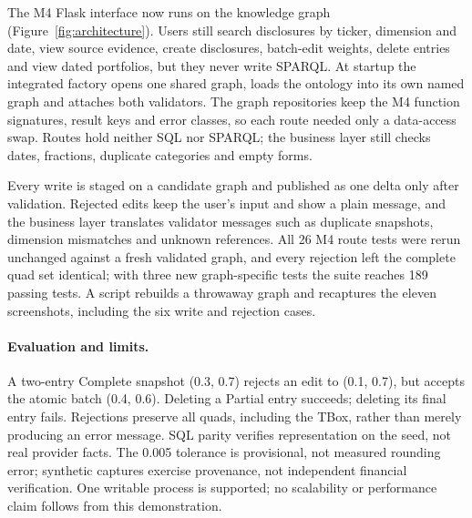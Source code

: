 The M4 Flask interface now runs on the knowledge graph
(Figure~\ref{fig:architecture}). Users still search disclosures by ticker,
dimension and date, view source evidence, create disclosures, batch-edit
weights, delete entries and view dated portfolios, but they never write SPARQL.
At startup the integrated factory opens one shared graph, loads the ontology into
its own named graph and attaches both validators. The graph repositories keep the
M4 function signatures, result keys and error classes, so each route needed only
a data-access swap. Routes hold neither SQL nor SPARQL; the business layer still checks
dates, fractions, duplicate categories and empty forms.

Every write is staged on a candidate graph and published as one delta only after
validation. Rejected edits keep the user's input and show a plain message, and the business
layer translates validator messages such as duplicate snapshots, dimension
mismatches and unknown references. All 26 M4 route tests were rerun
unchanged against a fresh validated graph, and every rejection left the complete
quad set identical; with three new graph-specific tests the suite reaches 189
passing tests. A script rebuilds a throwaway graph and recaptures the eleven screenshots,
including the six write and rejection cases.

\paragraph{Evaluation and limits.}
A two-entry Complete snapshot (0.3, 0.7) rejects an edit to (0.1, 0.7), but
accepts the atomic batch (0.4, 0.6). Deleting a Partial entry succeeds; deleting
its final entry fails. Rejections preserve all quads, including the TBox, rather
than merely producing an error message. SQL parity verifies representation on
the seed, not real provider facts. The 0.005 tolerance is provisional, not measured
rounding error; synthetic captures exercise provenance, not independent financial
verification. One writable process is supported; no scalability or performance
claim follows from this demonstration.

